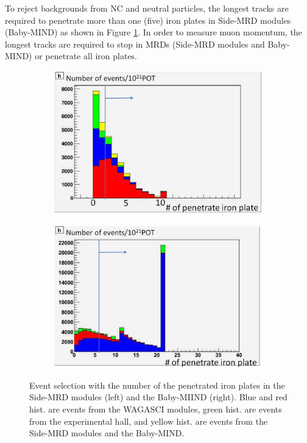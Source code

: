 To reject backgrounds from NC and neutral particles, the longest tracks are required to penetrate more than one (five) iron plates in Side-MRD modules (Baby-MIND) as shown in Figure \ref{fig:penetrated_iron_plates_cut}.
In order to measure muon momentum, the longest tracks are required to stop in MRDs (Side-MRD modules and Baby-MIND) or penetrate all iron plates.

\begin{figure}[tbh]
  \begin{center}
   \begin{subfigure}{0.48\textwidth}
     \includegraphics[width=\linewidth]{fig/penetrated_iron_plates_cut_sidemrd.pdf}
    \end{subfigure}
  \begin{subfigure}{0.48\textwidth}
      \includegraphics[width=\linewidth]{fig/penetrated_iron_plates_cut_babymind.pdf}
    \end{subfigure}    
    \end{center}
  \caption{
Event selection with the number of the penetrated iron plates in the Side-MRD modules (left) and the Baby-MIIND (right).
Blue and red hist. are events from the WAGASCI modules, green hist. are events from the experimental hall, and yellow hist. are events from the Side-MRD modules and the Baby-MIND.
}
\label{fig:penetrated_iron_plates_cut}
\end{figure}


